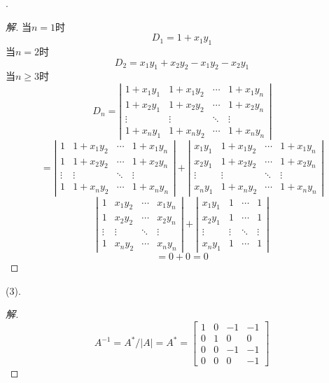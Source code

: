 \documentclass[10pt,a4paper]{report}
\begin{document}
.
\begin{proof}[解]
	当$n=1$时\\
	$$
	D_{1} = 1+x_{1}y_{1}
	$$
	当$n=2$时\\
	$$
	D_{2} = x_{1}y_{1}+x_{2}y_{2}-x_{1}y_{2}-x_{2}y_{1}
	$$
	当$n \geq 3$时\\
	$$D_{n}= \left|
	\begin{matrix}
	1+x_{1}y_{1} & 1+x_{1}y_{2} & \cdots & 1+x_{1}y_{n}\\
	1+x_{2}y_{1} & 1+x_{2}y_{2} & \cdots & 1+x_{2}y_{n}\\
	\vdots & \vdots & \ddots & \vdots\\
	1+x_{n}y_{1} & 1+x_{n}y_{2} & \cdots & 1+x_{n}y_{n}
	\end{matrix}
	\right|$$
	$$
	= \left|
	\begin{matrix}
	1 & 1+x_{1}y_{2} & \cdots & 1+x_{1}y_{n}\\
	1 & 1+x_{2}y_{2} & \cdots & 1+x_{2}y_{n}\\
	\vdots & \vdots & \ddots & \vdots\\
	1 & 1+x_{n}y_{2} & \cdots & 1+x_{n}y_{n}
	\end{matrix}
	\right|+\left|
	\begin{matrix}
	x_{1}y_{1} & 1+x_{1}y_{2} & \cdots & 1+x_{1}y_{n}\\
	x_{2}y_{1} & 1+x_{2}y_{2} & \cdots & 1+x_{2}y_{n}\\
	\vdots & \vdots & \ddots & \vdots\\
	x_{n}y_{1} & 1+x_{n}y_{2} & \cdots & 1+x_{n}y_{n}
	\end{matrix}
	\right|
	$$
	$$
	\left|
	\begin{matrix}
	1 & x_{1}y_{2} & \cdots & x_{1}y_{n}\\
	1 & x_{2}y_{2} & \cdots & x_{2}y_{n}\\
	\vdots & \vdots & \ddots & \vdots\\
	1 & x_{n}y_{2} & \cdots & x_{n}y_{n}
	\end{matrix}
	\right|+\left|
	\begin{matrix}
	x_{1}y_{1} & 1 & \cdots & 1\\
	x_{2}y_{1} & 1 & \cdots & 1\\
	\vdots & \vdots & \ddots & \vdots\\
	x_{n}y_{1} & 1 & \cdots & 1
	\end{matrix}
	\right|
	$$
	$$
	=0+0=0
	$$
\end{proof}
(3).
\begin{proof}[解]
	$$A^{-1} = A^{*}/|A| = A^{*} = \left[
	\begin{matrix}
	1 & 0 & -1 & -1\\
	0 & 1 & 0 & 0\\
	0 & 0 & -1 & -1 \\
	0 & 0 & 0 & -1 
	\end{matrix}
	\right]
	$$
\end{proof}
\end{document}
